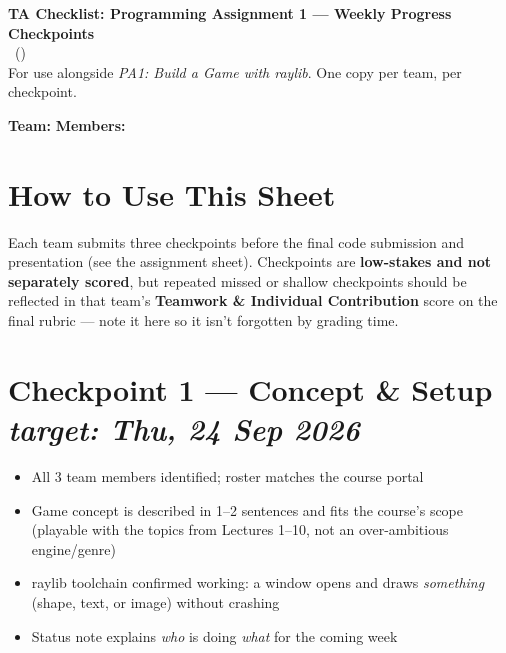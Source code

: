 \documentclass[11pt]{article}
\newcommand{\ybox}{$\square$\ }
\begin{document}
\begin{tcolorbox}[
  enhanced,
  colback=accentlight,
  colframe=accent,
  boxrule=0.5pt,
  arc=2pt,
  left=10pt, right=10pt, top=8pt, bottom=8pt
]
  {\Large\bfseries\color{accent} TA Checklist: Programming Assignment 1 --- Weekly Progress Checkpoints}\\[2pt]
  {\small \CourseName\ifx\CourseCode\empty\else\ (\CourseCode)\fi\quad\textbar\quad \Semester}\\[1pt]
  {\small For use alongside \emph{PA1: Build a Game with raylib}. One copy per team, per checkpoint.}
\end{tcolorbox}

\vspace{4pt}
\noindent\textbf{Team:} \makebox[4cm]{\hrulefill} \quad
\textbf{Members:} \makebox[7cm]{\hrulefill}

\section*{How to Use This Sheet}

Each team submits three checkpoints before the final code submission and presentation
(see the assignment sheet). Checkpoints are \textbf{low-stakes and not separately scored},
but repeated missed or shallow checkpoints should be reflected in that team's
\textbf{Teamwork \& Individual Contribution} score on the final rubric --- note it here so it
isn't forgotten by grading time.

\section*{Checkpoint 1 --- Concept \& Setup \hfill {\small \itshape target: Thu, 24 Sep 2026}}

\begin{itemize}[leftmargin=1.4em,itemsep=3pt]
  \item[\ybox] All 3 team members identified; roster matches the course portal
  \item[\ybox] Game concept is described in 1--2 sentences and fits the course's scope
        (playable with the topics from Lectures 1--10, not an over-ambitious engine/genre)
  \item[\ybox] raylib toolchain confirmed working: a window opens and draws \emph{something}
        (shape, text, or image) without crashing
  \item[\ybox] Status note explains \emph{who} is doing \emph{what} for the coming week
\end{itemize}
\end{document}
